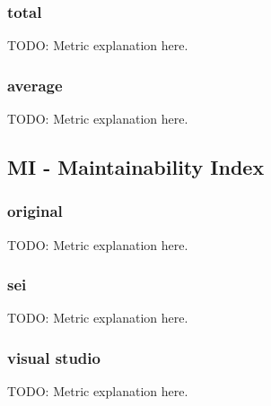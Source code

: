 \subsubsection{total}
TODO: Metric explanation here.

\subsubsection{average}
TODO: Metric explanation here.

\subsection{MI - Maintainability Index}

\subsubsection{original}
TODO: Metric explanation here.

\subsubsection{sei}
TODO: Metric explanation here.

\subsubsection{visual studio}
TODO: Metric explanation here.

